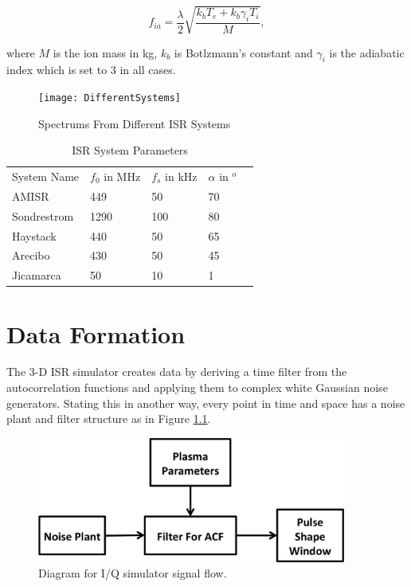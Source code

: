 \documentclass[10pt]{report}
\begin{document}
\begin{equation}
\label{eq:iaf}
f_{ia} = \frac{\lambda}{2}\sqrt{\frac{k_bT_e +k_b\gamma_iT_i}{M}},
\end{equation}

\noindent where $M$ is the ion mass in kg, $k_b$ is Botlzmann's constant and $\gamma_i$ is the adiabatic index which is set to 3 in all cases.
\begin{figure}[!h]
\centering
\texttt{[image: DifferentSystems]}

\caption{Spectrums From Different ISR Systems}
\label{fig:diffspectrums}
\end{figure}

\begin{table}[!h]
\centering
\caption{ISR System Parameters}
\label{tab:ISRsys}
\begin{tabular}{lllll}
System Name & $f_0$ in MHz & $f_s$ in kHz & $\alpha$ in $^o$ &  \\
AMISR       & 449          & 50           & 70               &  \\
Sondrestrom & 1290         & 100          & 80               &  \\
Haystack    & 440          & 50           & 65               &  \\
Arecibo     & 430          & 50           & 45               &  \\
Jicamarca   & 50           & 10           & 1                & 
\end{tabular}
\end{table}
\chapter{Data Formation}
The 3-D ISR simulator creates data by deriving a time filter from the autocorrelation functions and applying them to complex white Gaussian noise generators. Stating this in another way, every point in time and space has a noise plant and filter structure as in Figure \ref{fig:IQdiagram}. 
\begin{figure}[h!]
\centering
\includegraphics[width=4in]{diagrampart}
\caption{Diagram for I/Q simulator signal flow.}
\label{fig:IQdiagram}
\end{figure}
\end{document}
